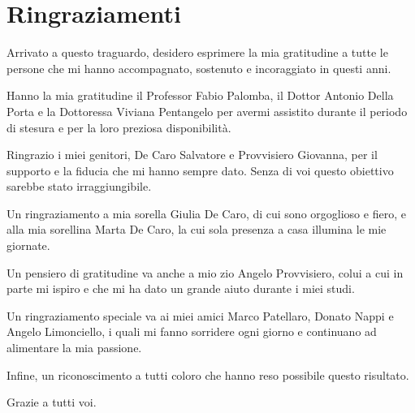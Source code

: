 \chapter*{Ringraziamenti}
\fancyhf{}
Arrivato a questo traguardo, desidero esprimere la mia gratitudine a tutte le persone che mi hanno accompagnato, sostenuto e incoraggiato in questi anni.

Hanno la mia gratitudine il Professor Fabio Palomba, il Dottor Antonio Della Porta e la Dottoressa Viviana Pentangelo per avermi assistito durante il periodo di stesura e per la loro preziosa disponibilità.

Ringrazio i miei genitori, De Caro Salvatore e Provvisiero Giovanna, per il supporto e la fiducia che mi hanno sempre dato. Senza di voi questo obiettivo sarebbe stato irraggiungibile.

Un ringraziamento a mia sorella Giulia De Caro, di cui sono orgoglioso e fiero, e alla mia sorellina Marta De Caro, la cui sola presenza a casa illumina le mie giornate.

Un pensiero di gratitudine va anche a mio zio Angelo Provvisiero, colui a cui in parte mi ispiro e che mi ha dato un grande aiuto durante i miei studi.

Un ringraziamento speciale va ai miei amici Marco Patellaro, Donato Nappi e Angelo Limonciello, i quali mi fanno sorridere ogni giorno e continuano ad alimentare la mia passione.

Infine, un riconoscimento a tutti coloro che hanno reso possibile questo risultato.

Grazie a tutti voi.
